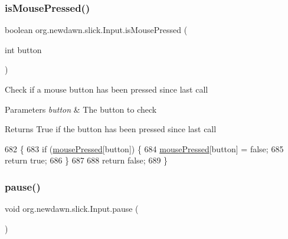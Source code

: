 \subsubsection{\texorpdfstring{is\+Mouse\+Pressed()}{isMousePressed()}}
{\footnotesize\ttfamily boolean org.\+newdawn.\+slick.\+Input.\+is\+Mouse\+Pressed (\begin{DoxyParamCaption}\item[{int}]{button }\end{DoxyParamCaption})\hspace{0.3cm}{\ttfamily [inline]}}

Check if a mouse button has been pressed since last call


\begin{DoxyParams}{Parameters}
{\em button} & The button to check \\
\hline
\end{DoxyParams}
\begin{DoxyReturn}{Returns}
True if the button has been pressed since last call 
\end{DoxyReturn}

\begin{DoxyCode}
682                                               \{
683         \textcolor{keywordflow}{if} (\mbox{\hyperlink{classorg_1_1newdawn_1_1slick_1_1_input_a83047186fefd663f5749fcdf6bb3b20d}{mousePressed}}[button]) \{
684             \mbox{\hyperlink{classorg_1_1newdawn_1_1slick_1_1_input_a83047186fefd663f5749fcdf6bb3b20d}{mousePressed}}[button] = \textcolor{keyword}{false};
685             \textcolor{keywordflow}{return} \textcolor{keyword}{true};
686         \}
687         
688         \textcolor{keywordflow}{return} \textcolor{keyword}{false};
689     \}
\end{DoxyCode}
\mbox{\label{classorg_1_1newdawn_1_1slick_1_1_input_a5fe572bdb06dc3e97999d14637757707}} 
\subsubsection{\texorpdfstring{pause()}{pause()}}
{\footnotesize\ttfamily void org.\+newdawn.\+slick.\+Input.\+pause (\begin{DoxyParamCaption}{ }\end{DoxyParamCaption})\hspace{0.3cm}{\ttfamily [inline]}}

